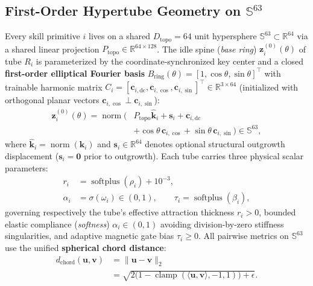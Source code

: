 \documentclass[10pt,twocolumn]{article}
\begin{document}
\subsection{First-Order Hypertube Geometry on \texorpdfstring{$\mathbb{S}^{63}$}{S\textasciicircum 63}}
Every skill primitive $i$ lives on a shared $D_{\text{topo}}=64$ unit hypersphere $\mathbb{S}^{63} \subset \mathbb{R}^{64}$ via a shared linear projection $P_{\text{topo}} \in \mathbb{R}^{64 \times 128}$. The idle spine (\emph{base ring}) $\mathbf{z}_i^{(0)}(\theta)$ of tube $R_i$ is parameterized by the coordinate-synchronized key center and a closed \textbf{first-order elliptical Fourier basis} $B_{\text{ring}}(\theta) = [1,\cos\theta,\sin\theta]^\top$ with trainable harmonic matrix $C_i = [\mathbf{c}_{i,\text{dc}}, \mathbf{c}_{i,\cos}, \mathbf{c}_{i,\sin}]^\top \in \mathbb{R}^{3 \times 64}$ (initialized with orthogonal planar vectors $\mathbf{c}_{i,\cos} \perp \mathbf{c}_{i,\sin}$):
\begin{equation}
\begin{aligned}
  \mathbf{z}_i^{(0)}(\theta) = \operatorname{norm}\!\bigl(
    & P_{\text{topo}}\hat{\mathbf{k}}_i + \mathbf{s}_i + \mathbf{c}_{i,\text{dc}} \\
    & + \cos\theta\,\mathbf{c}_{i,\cos} + \sin\theta\,\mathbf{c}_{i,\sin}
  \bigr) \in \mathbb{S}^{63},
\end{aligned}
\label{eq:base_ring}
\end{equation}
where $\hat{\mathbf{k}}_i = \operatorname{norm}(\mathbf{k}_i)$ and $\mathbf{s}_i \in \mathbb{R}^{64}$ denotes optional structural outgrowth displacement ($\mathbf{s}_i=\mathbf{0}$ prior to outgrowth). Each tube carries three physical scalar parameters:
\begin{equation}
\begin{aligned}
  r_i &= \operatorname{softplus}(\rho_i) + 10^{-3}, \\
  \alpha_i &= \sigma(\omega_i) \in (0,1), \qquad
  \tau_i = \operatorname{softplus}(\beta_i),
\end{aligned}
\end{equation}
governing respectively the tube's effective attraction thickness $r_i > 0$, bounded elastic compliance (\emph{softness}) $\alpha_i \in (0,1)$ avoiding division-by-zero stiffness singularities, and adaptive magnetic gate bias $\tau_i \ge 0$. All pairwise metrics on $\mathbb{S}^{63}$ use the unified \textbf{spherical chord distance}:
\begin{equation}
\begin{aligned}
  d_{\text{chord}}(\mathbf{u}, \mathbf{v})
  &= \|\mathbf{u} - \mathbf{v}\|_2 \\
  &= \sqrt{2\bigl(1 - \operatorname{clamp}(\langle \mathbf{u}, \mathbf{v}\rangle, -1, 1)\bigr) + \epsilon}.
\end{aligned}
\end{equation}
\end{document}
